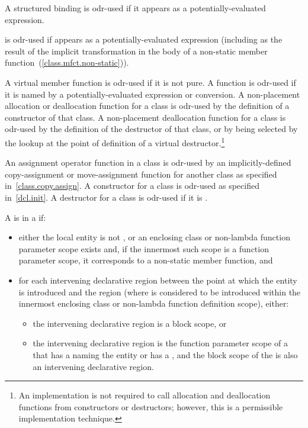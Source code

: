 \pnum
A structured binding is odr-used if it appears as a potentially-evaluated expression.

\pnum
{} is odr-used if  appears as a potentially-evaluated expression
(including as the result of the implicit transformation in the body of a non-static
member function~(\ref{class.mfct.non-static})).

\pnum
A virtual member
function is odr-used if it is not pure.
A function is odr-used if it is named by
a potentially-evaluated expression or conversion.
A non-placement allocation or deallocation
function for a class is odr-used by the definition of a constructor of that
class. A non-placement deallocation function for a class is odr-used by the
definition of the destructor of that class, or by being selected by the
lookup at the point of definition of a virtual
destructor.\footnote{An implementation is not required
to call allocation and
deallocation functions from constructors or destructors; however, this
is a permissible implementation technique.}

\pnum
An assignment operator function in a class is odr-used by an
implicitly-defined
copy-assignment or move-assignment function for another class as specified
in~\ref{class.copy.assign}.
A constructor for a class is odr-used as specified
in~\ref{dcl.init}. A destructor for a class is odr-used if it is
.

\pnum
A 
is  in a  if:
\begin{itemize}
\item either the local entity is not , or
an enclosing class or non-lambda function parameter scope exists and,
if the innermost such scope is a function parameter scope,
it corresponds to a non-static member function, and
\item
for each intervening declarative region
between the point at which the entity is introduced and the region
(where  is considered to be introduced
within the innermost enclosing class or non-lambda function definition scope),
either:
\begin{itemize}
\item the intervening declarative region is a block scope, or
\item the intervening declarative region is the function parameter scope of a 
that has a 
naming the entity or has a , and
the block scope of the 
is also an intervening declarative region.
\end{itemize}
\end{itemize}

